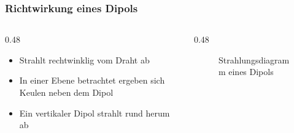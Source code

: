 \begin{frame}
    \frametitle{Richtwirkung eines Dipols}
    \begin{columns}
        \begin{column}{0.48\textwidth}
            \begin{itemize}
                \item Strahlt rechtwinklig vom Draht ab
                \item In einer Ebene betrachtet ergeben sich Keulen neben dem Dipol
                \item Ein vertikaler Dipol strahlt rund herum ab
            \end{itemize}

        \end{column}
        \begin{column}{0.48\textwidth}

            \begin{figure}
                \caption{\scriptsize Strahlungsdiagramm eines Dipols}
                \label{e_antennenformen_strahlungsdiagramm_dipol}
            \end{figure}


        \end{column}
    \end{columns}

\end{frame}

\begin{frame}
\end{frame}

